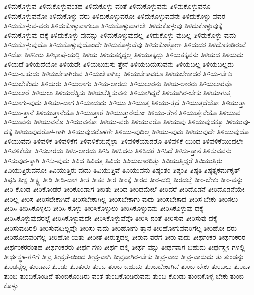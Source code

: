 {ತಿಳಿದುಕೊಳ್ಳುವ
ತಿಳಿದುಕೊಳ್ಳುವಂತಹ
ತಿಳಿದುಕೊಳ್ಳು-ವಂತೆ
ತಿಳಿದುಕೊಳ್ಳುವನು
ತಿಳಿದುಕೊಳ್ಳುವನೊ
ತಿಳಿದುಕೊಳ್ಳುವನೋ
ತಿಳಿದುಕೊಳ್ಳು-ವರು
ತಿಳಿದುಕೊಳ್ಳುವರೋ
ತಿಳಿದುಕೊಳ್ಳುವವನೇ
ತಿಳಿದುಕೊಳ್ಳು-ವವರ
ತಿಳಿದುಕೊಳ್ಳುವ-ವರು
ತಿಳಿದುಕೊಳ್ಳುವಾಗಲೂ
ತಿಳಿದುಕೊಳ್ಳುವಾಗಲೇ
ತಿಳಿದುಕೊಳ್ಳುವು
ತಿಳಿದುಕೊಳ್ಳುವುಕ್ಕೆ
ತಿಳಿದುಕೊಳ್ಳುವು-ದಕ್ಕೆ
ತಿಳಿದುಕೊಳ್ಳು-ವುದನ್ನು
ತಿಳಿದುಕೊಳ್ಳುವುದಲ್ಲ
ತಿಳಿದುಕೊಳ್ಳು-ವುದಿಲ್ಲ
ತಿಳಿದುಕೊಳ್ಳು-ವುದು
ತಿಳಿದುಕೊಳ್ಳುವುದೊ
ತಿಳಿದುಕೊಳ್ಳುವುದೊಂದೇ
ತಿಳಿದುಕೊಳ್ಳುವೆವು
ತಿಳಿದುಕೊಳ್ಳೋಣ
ತಿಳಿದುದರ
ತಿಳಿದೊಕಂಡಿರುವೆ
ತಿಳಿದೋ
ತಿಳಿನೀರು
ತಿಳಿಭಾಷೆ-ಯಲ್ಲಿ
ತಿಳಿಯ
ತಿಳಿಯತಕ್ಕದ್ದಲ್ಲ
ತಿಳಿಯತಕ್ಕದ್ದು
ತಿಳಿಯತಕ್ಕವನು
ತಿಳಿಯದ
ತಿಳಿಯದು
ತಿಳಿಯದೆ
ತಿಳಿಯದೆಯೋ
ತಿಳಿಯದೇ
ತಿಳಿಯಬಯಸು-ತ್ತೇನೆ
ತಿಳಿಯಬಯಸುವನು
ತಿಳಿಯಬಲ್ಲ
ತಿಳಿಯಬಲ್ಲದು
ತಿಳಿಯ-ಬಹುದು
ತಿಳಿಯಬೇಕಾಗಿರುವ
ತಿಳಿಯಬೇಕಾಗಿಲ್ಲ
ತಿಳಿಯಬೇಕಾದರೂ
ತಿಳಿಯಬೇಕಾದರೆ
ತಿಳಿಯ-ಬೇಕು
ತಿಳಿಯಬೇಕೆಂದು
ತಿಳಿಯರು
ತಿಳಿಯಲಾಗು
ತಿಳಿಯ-ಲಾರದು
ತಿಳಿಯಲಾರನು
ತಿಳಿಯ-ಲಾರರು
ತಿಳಿಯಲಾರವೊ
ತಿಳಿಯಲಾರೆ
ತಿಳಿಯಲು
ತಿಳಿಯಲೆತ್ನಿಸು
ತಿಳಿಯಲೆತ್ನಿಸುವನು
ತಿಳಿಯಾಗಿದ್ದರೆ
ತಿಳಿಯಾಗಿರ-ಬೇಕು
ತಿಳಿಯಾಗುತ್ತ
ತಿಳಿಯಾಗು-ವುದು
ತಿಳಿಯಾ-ದಾಗ
ತಿಳಿಯಾದುದು
ತಿಳಿಯು
ತಿಳಿಯುತ್ತ
ತಿಳಿಯು-ತ್ತದೆ
ತಿಳಿಯುತ್ತದೆಯೋ
ತಿಳಿಯುತ್ತಾ
ತಿಳಿಯು-ತ್ತಾನೆ
ತಿಳಿಯುತ್ತಾನೆಯೊ
ತಿಳಿಯುತ್ತಾರೆ
ತಿಳಿಯುತ್ತಾರೆಯೋ
ತಿಳಿಯು-ತ್ತೇನೆ
ತಿಳಿಯುತ್ತೇವೆಯೊ
ತಿಳಿಯುವ
ತಿಳಿಯುವನು
ತಿಳಿಯುವನೊ
ತಿಳಿಯುವನೋ
ತಿಳಿಯು-ವರು
ತಿಳಿಯುವರೊ
ತಿಳಿಯುವು
ತಿಳಿಯುವುದಕ್ಕೂ
ತಿಳಿಯುವು-ದಕ್ಕೆ
ತಿಳಿಯುವುದರೊಳ-ಗಾಗಿ
ತಿಳಿಯುವುದರೊಳಗೇ
ತಿಳಿಯು-ವುದಿಲ್ಲ
ತಿಳಿಯು-ವುದು
ತಿಳಿಯುವುದೇ
ತಿಳಿಯುವುದೊ
ತಿಳಿಯುವೆವು
ತಿಳಿವಳಿಕೆ
ತಿಳಿವಳಿಕೆಗೆ
ತಿಳಿವಳಿಕೆಯನ್ನೆಲ್ಲಾ
ತಿಳಿವಳಿಕೆಯಾದರೊ
ತಿಳಿವಳಿಕೆ-ಯಿಂದ
ತಿಳಿವಳಿಕೆಯಿಂದಲೇ
ತಿಳಿವಳಿಕೆಯೇ
ತಿಳಿಸಬಾರದು
ತಿಳಿಸ-ಲಾರದು
ತಿಳಿಸಿ
ತಿಳಿಸಿದನು
ತಿಳಿಸಿದರೆ
ತಿಳಿಸಿದೆ
ತಿಳಿಸು-ತ್ತಾನೆ
ತಿಳಿಸುವವನು
ತಿಳಿಸುವುದ-ಕ್ಕಾಗಿ
ತಿಳಿಸು-ವುದು
ತಿವಿದ
ತಿವಿದತ್ತ
ತಿವಿದು
ತಿವಿಯಬಾರದಿತ್ತು
ತಿವಿಯುತ್ತಿದ್ದರೆ
ತಿವಿಯುತ್ತಿರು
ತಿವಿಯುತ್ತಿರುವನೋ
ತಿವಿಯುತ್ತಿರು-ವುದು
ತಿವಿಯುತ್ತಿವೆ
ತಿವಿಯುವನು
ತಿಷ್ಠಂತಂ
ತಿಷ್ಠಂತಿ
ತಿಷ್ಠತಿ
ತಿಷ್ಠತ್ಯಕರ್ಮಕೃತ್
ತಿಷ್ಠಸಿ
ತೀಕ್ಷ
ತೀಕ್ಷ್ಣ
ತೀಡಿ
ತೀಡಿ-ದಾಗ
ತೀತ
ತೀತನ
ತೀರ
ತೀರಕ್ಕೆ
ತೀರದ
ತೀರ-ದಲ್ಲಿ
ತೀರದಲ್ಲೆ
ತೀರ-ಬೇಕು
ತೀರ-ವನ್ನು
ತೀರಿ-ಕೊಂಡ
ತೀರಿಕೊಂಡರೆ
ತೀರಿಕೊಂಡಾಗ
ತೀರಿತು
ತೀರಿದ
ತೀರಿದಮೇಲೆ
ತೀರಿದರೆ
ತೀರಿದೊಡನೆ
ತೀರಿದೊಡನೆಯೇ
ತೀರಿಲ್ಲ
ತೀರಿಸ
ತೀರಿಸಬೇಕಾಗಿದೆ
ತೀರಿಸಬೇಕಾಗಿಲ್ಲ
ತೀರಿಸಬೇಕಾಗು-ವುದು
ತೀರಿಸಬೇಕಾದ
ತೀರಿಸ-ಬೇಕು
ತೀರಿಸಲು
ತೀರಿಸಿ
ತೀರಿಸಿಕೊಳ್ಳಲು
ತೀರಿಸಿ-ಕೊಳ್ಳು
ತೀರಿಸಿಕೊಳ್ಳುಲು
ತೀರಿಸಿಕೊಳ್ಳುವನು
ತೀರಿಸಿಕೊಳ್ಳುವು-ದಕ್ಕೆ
ತೀರಿಸಿಕೊಳ್ಳುವುದರಲ್ಲೆ
ತೀರಿಸಿಕೊಳ್ಳುವುದೇ
ತೀರಿಸಿಕೊಳ್ಳುವೆವೊ
ತೀರಿಸಿ-ದಂತೆ
ತೀರಿಸುವ
ತೀರಿಸುವು-ದಕ್ಕೆ
ತೀರಿಸುವುದಿರಲಿ
ತೀರಿಸುವುದಿಲ್ಲವೊ
ತೀರಿಸು-ವುದು
ತೀರಿಹೋಗು-ತ್ತಾನೆ
ತೀರಿಹೋಗುವವರಿಗೆಲ್ಲ
ತೀರಿಹೋ-ದರು
ತೀರಿಹೋದವರಿಗೆಲ್ಲ
ತೀರಿಹೋ-ಯಿತು
ತೀರೀತೆ
ತೀರುತ್ತದಲ್ಲ
ತೀರುವ-ವರೆಗೆ
ತೀರು-ವುದು
ತೀರ್ಥಂಕರ
ತೀರ್ಥಂಕರರ
ತೀರ್ಥಂಕರರಂತಹ
ತೀರ್ಥಂಕರರು
ತೀರ್ಥ-ಗಳು
ತೀರ್ಥ-ದಲ್ಲಿ
ತೀರ್ಥ-ವನ್ನು
ತೀರ್ಥವಾಗ-ಬಹುದು
ತೀರ್ಥಸ್ಥಳ-ಗಳಲ್ಲಿ
ತೀರ್ಥಸ್ಥಳ-ಗಳಿಗೆ
ತೀವ್ರ
ತೀವ್ರತೆ-ಯಿಂದ
ತೀವ್ರ-ವಾಗಿ
ತೀವ್ರವಾಗಿರ-ಬೇಕು
ತೀವ್ರ-ವಾದ
ತೀವ್ರ-ವಾದುದು
ತು
ತುಂಡನ್ನು
ತುಂಡನ್ನೆಲ್ಲ
ತುಂಡಾದ
ತುಂಡು
ತುಂತುರು
ತುಂಬ
ತುಂಬ-ಬಹುದು
ತುಂಬಬೇಕಾಗಿದೆ
ತುಂಬ-ಬೇಕು
ತುಂಬಲು
ತುಂಬಾ
ತುಂಬಿ
ತುಂಬಿಕೊಂಡಿದೆ
ತುಂಬಿಕೊಂಡಿರು-ವಂತೆ
ತುಂಬಿಕೊಂಡಿರುವನು
ತುಂಬಿ-ಕೊಂಡು
ತುಂಬಿಕೊಳ್ಳ-ಬೇಕು
ತುಂಬಿ-ಕೊಳ್ಳು
}
